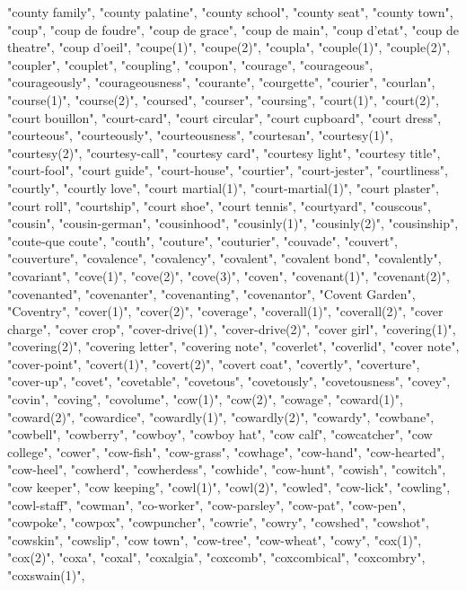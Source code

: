"county family",
"county palatine",
"county school",
"county seat",
"county town",
"coup",
"coup de foudre",
"coup de grace",
"coup de main",
"coup d'etat",
"coup de theatre",
"coup d'oeil",
"coupe(1)",
"coupe(2)",
"coupla",
"couple(1)",
"couple(2)",
"coupler",
"couplet",
"coupling",
"coupon",
"courage",
"courageous",
"courageously",
"courageousness",
"courante",
"courgette",
"courier",
"courlan",
"course(1)",
"course(2)",
"coursed",
"courser",
"coursing",
"court(1)",
"court(2)",
"court bouillon",
"court-card",
"court circular",
"court cupboard",
"court dress",
"courteous",
"courteously",
"courteousness",
"courtesan",
"courtesy(1)",
"courtesy(2)",
"courtesy-call",
"courtesy card",
"courtesy light",
"courtesy title",
"court-fool",
"court guide",
"court-house",
"courtier",
"court-jester",
"courtliness",
"courtly",
"courtly love",
"court martial(1)",
"court-martial(1)",
"court plaster",
"court roll",
"courtship",
"court shoe",
"court tennis",
"courtyard",
"couscous",
"cousin",
"cousin-german",
"cousinhood",
"cousinly(1)",
"cousinly(2)",
"cousinship",
"coute-que coute",
"couth",
"couture",
"couturier",
"couvade",
"couvert",
"couverture",
"covalence",
"covalency",
"covalent",
"covalent bond",
"covalently",
"covariant",
"cove(1)",
"cove(2)",
"cove(3)",
"coven",
"covenant(1)",
"covenant(2)",
"covenanted",
"covenanter",
"covenanting",
"covenantor",
"Covent Garden",
"Coventry",
"cover(1)",
"cover(2)",
"coverage",
"coverall(1)",
"coverall(2)",
"cover charge",
"cover crop",
"cover-drive(1)",
"cover-drive(2)",
"cover girl",
"covering(1)",
"covering(2)",
"covering letter",
"covering note",
"coverlet",
"coverlid",
"cover note",
"cover-point",
"covert(1)",
"covert(2)",
"covert coat",
"covertly",
"coverture",
"cover-up",
"covet",
"covetable",
"covetous",
"covetously",
"covetousness",
"covey",
"covin",
"coving",
"covolume",
"cow(1)",
"cow(2)",
"cowage",
"coward(1)",
"coward(2)",
"cowardice",
"cowardly(1)",
"cowardly(2)",
"cowardy",
"cowbane",
"cowbell",
"cowberry",
"cowboy",
"cowboy hat",
"cow calf",
"cowcatcher",
"cow college",
"cower",
"cow-fish",
"cow-grass",
"cowhage",
"cow-hand",
"cow-hearted",
"cow-heel",
"cowherd",
"cowherdess",
"cowhide",
"cow-hunt",
"cowish",
"cowitch",
"cow keeper",
"cow keeping",
"cowl(1)",
"cowl(2)",
"cowled",
"cow-lick",
"cowling",
"cowl-staff",
"cowman",
"co-worker",
"cow-parsley",
"cow-pat",
"cow-pen",
"cowpoke",
"cowpox",
"cowpuncher",
"cowrie",
"cowry",
"cowshed",
"cowshot",
"cowskin",
"cowslip",
"cow town",
"cow-tree",
"cow-wheat",
"cowy",
"cox(1)",
"cox(2)",
"coxa",
"coxal",
"coxalgia",
"coxcomb",
"coxcombical",
"coxcombry",
"coxswain(1)",
